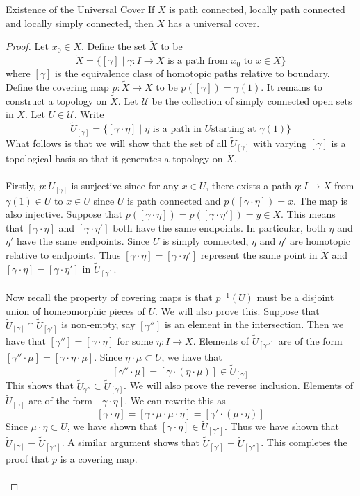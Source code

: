 \documentclass[a4paper]{article}
\begin{document}
\begin{thm}{Existence of the Universal Cover}{} If $X$ is path connected, locally path connected and locally simply connected, then $X$ has a universal cover. \tcbline
\begin{proof}
Let $x_0\in X$. Define the set $\tilde{X}$ to be $$\tilde{X}=\{[\gamma]\;|\;\gamma:I\to X\text{ is a path from }x_0\text{ to }x\in X\}$$ where $[\gamma]$ is the equivalence class of homotopic paths relative to boundary. Define the covering map $p:\tilde{X}\to X$ to be $p([\gamma])=\gamma(1)$. It remains to construct a topology on $\tilde{X}$. Let $\mathcal{U}$ be the collection of simply connected open sets in $X$. Let $U\in\mathcal{U}$. Write $$\tilde{U}_{[\gamma]}=\{[\gamma\cdot\eta]\;|\;\eta\text{ is a path in }U\text{starting at }\gamma(1)\}$$ What follows is that we will show that the set of all $\tilde{U}_{[\gamma]}$ with varying $[\gamma]$ is a topological basis so that it generates a topology on $\tilde{X}$. \\~\\

Firstly, $p:\tilde{U}_{[\gamma]}$ is surjective since for any $x\in U$, there exists a path $\eta:I\to X$ from $\gamma(1)\in U$ to $x\in U$ since $U$ is path connected and $p([\gamma\cdot\eta])=x$. The map is also injective. Suppose that $p([\gamma\cdot\eta])=p([\gamma\cdot\eta'])=y\in X$. This means that $[\gamma\cdot\eta]$ and $[\gamma\cdot\eta']$ both have the same endpoints. In particular, both $\eta$ and $\eta'$ have the same endpoints. Since $U$ is simply connected, $\eta$ and $\eta'$ are homotopic relative to endpoints. Thus $[\gamma\cdot\eta]=[\gamma\cdot\eta']$ represent the same point in $\tilde{X}$ and $[\gamma\cdot\eta]=[\gamma\cdot\eta']$ in $\tilde{U}_{[\gamma]}$. \\~\\

Now recall the property of covering maps is that $p^{-1}(U)$ must be a disjoint union of homeomorphic pieces of $U$. We will also prove this. Suppose that $\tilde{U}_{[\gamma]}\cap\tilde{U}_{[\gamma']}$ is non-empty, say $[\gamma'']$ is an element in the intersection. Then we have that $[\gamma'']=[\gamma\cdot\eta]$ for some $\eta:I\to X$. Elements of $\tilde{U}_{[\gamma'']}$ are of the form $[\gamma''\cdot\mu]=[\gamma\cdot\eta\cdot\mu]$. Since $\eta\cdot\mu\subset U$, we have that $$[\gamma''\cdot\mu]=[\gamma\cdot(\eta\cdot\mu)]\in\tilde{U}_{[\gamma]}$$ This shows that $\tilde{U}_{\gamma''}\subseteq\tilde{U}_{[\gamma]}$. We will also prove the reverse inclusion. Elements of $\tilde{U}_{[\gamma]}$ are of the form $[\gamma\cdot\eta]$. We can rewrite this as $$[\gamma\cdot\eta]=[\gamma\cdot\mu\cdot\overline{\mu}\cdot\eta]=[\gamma'\cdot(\overline{\mu}\cdot\eta)]$$ Since $\overline{\mu}\cdot\eta\subset U$, we have shown that $[\gamma\cdot\eta]\in\tilde{U}_{[\gamma'']}$. Thus we have shown that $\tilde{U}_{[\gamma]}=\tilde{U}_{[\gamma'']}$. A similar argument shows that $\tilde{U}_{[\gamma']}=\tilde{U}_{[\gamma'']}$. This completes the proof that $p$ is a covering map. \\~\\


\end{proof}
\end{thm}
\end{document}
